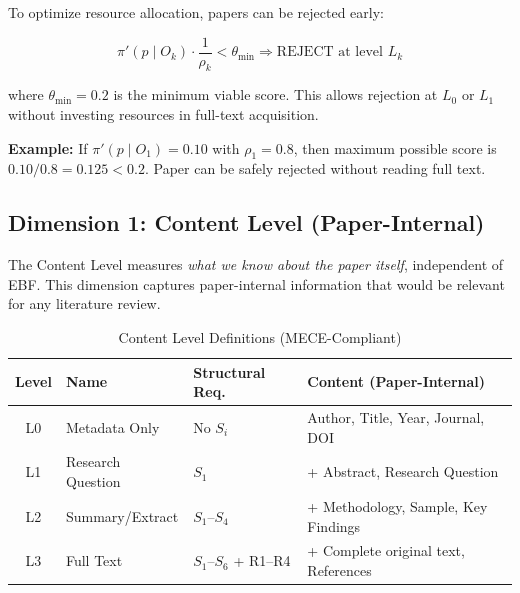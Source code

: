 \begin{tcolorbox}[colback=gray!10!white, colframe=gray!75!black,
    title=\textbf{Operational Rule: Early Rejection Threshold}]

To optimize resource allocation, papers can be rejected early:

\begin{equation}
\pi'(p \mid O_k) \cdot \frac{1}{\rho_k} < \theta_{\min} \Rightarrow \text{REJECT at level } L_k
\end{equation}

where $\theta_{\min} = 0.2$ is the minimum viable score. This allows rejection at $L_0$ or $L_1$
without investing resources in full-text acquisition.

\textbf{Example:} If $\pi'(p \mid O_1) = 0.10$ with $\rho_1 = 0.8$, then maximum possible
score is $0.10 / 0.8 = 0.125 < 0.2$. Paper can be safely rejected without reading full text.
\end{tcolorbox}

\subsection{Dimension 1: Content Level (Paper-Internal)}

The Content Level measures \textit{what we know about the paper itself}, independent of EBF.
This dimension captures paper-internal information that would be relevant for any literature review.

\begin{table}[htbp]
\centering
\caption{Content Level Definitions (MECE-Compliant)}
\label{tab:content-levels}
\renewcommand{\arraystretch}{1.3}
\begin{tabular}{@{}cllp{5.5cm}@{}}
\toprule
\textbf{Level} & \textbf{Name} & \textbf{Structural Req.} & \textbf{Content (Paper-Internal)} \\
\midrule
L0 & Metadata Only & No $S_i$ & Author, Title, Year, Journal, DOI \\
L1 & Research Question & $S_1$ & + Abstract, Research Question \\
L2 & Summary/Extract & $S_1$--$S_4$ & + Methodology, Sample, Key Findings \\
L3 & Full Text & $S_1$--$S_6$ + R1--R4 & + Complete original text, References \\
\bottomrule
\end{tabular}
\end{table}

